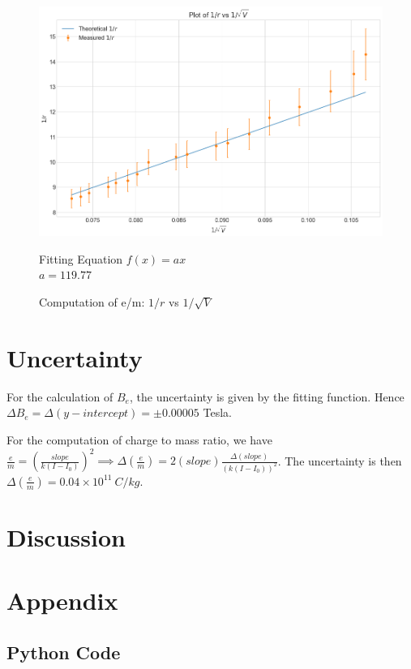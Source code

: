 \documentclass[a4paper,12pt]{article}
\begin{document}
\begin{figure}[H]
  \centering
  \includegraphics[width=0.8\linewidth]{../code/Pankaj/Charge To Mass Ratio.png}   
  \begin{center}
    Fitting Equation $f(x) = ax$ \\
    $a = 119.77$
  \end{center}   
  \caption{Computation of e/m: $1/r$ vs $1/\sqrt{V}$}
  \label{e_m}
\end{figure}

\section{Uncertainty}

For the calculation of $B_e$, the uncertainty is given by the fitting function. Hence $\Delta B_e = \Delta (y-intercept) = \pm 0.00005$ Tesla.

For the computation of charge to mass ratio, we have $\frac{e}{m} = (\frac{slope}{k(I-I_0)})^2 \implies 
\Delta (\frac{e}{m}) = 2 (slope) \frac{\Delta (slope)}{(k(I-I_0))^2}$. The uncertainty is then $\Delta (\frac{e}{m}) = 0.04 \times 10^{11}\ C/kg$.

\section{Discussion}
 

\pagebreak

\appendix

\section{Appendix}

\subsection{Python Code}
\end{document}
